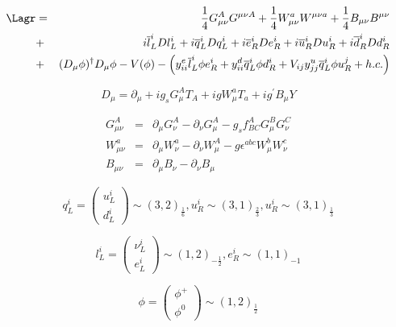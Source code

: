 \begin{eqnarray}
\Lagr & = & \frac{1}{4}G_{\mu\nu}^{A}G^{\mu\nu A} + \frac{1}{4}W_{\mu\nu}^{a}W^{\mu\nu a} + \frac{1}{4}B_{\mu\nu}B^{\mu\nu} \\
      & + & i\overline{l}_{L}^{i}Dl_{L}^{i} + i\overline{q}_{L}^{i}Dq_{L}^{i} + i\overline{e}_{R}^{i}De_{R}^{i} + i\overline{u}_{R}^{i}Du_{R}^{i}  + i\overline{d}_{R}^{i}Dd_{R}^{i} \\
      & + & (D_{\mu}\phi)^{\dagger}D_{\mu}\phi - V(\phi) - \left(y_{ii}^{e}\overline{l}_{L}^{i}\phi e_{R}^{i} + y_{ii}^{d}\overline{q}_{L}^{i}\phi d_{R}^{i} + V_{ij}y_{jj}^{u}\overline{q}_{L}^{i}\phi u_{R}^{j} + h.c.\right)
\end{eqnarray}

\begin{equation}
D_{\mu} = \partial_{\mu} + ig_{s}G_{\mu}^{A}T_{A} + igW_{\mu}^{a}T_{a} + ig^{\prime}B_{\mu}Y
\end{equation}

\begin{eqnarray}
G_{\mu\nu}^{A} & = & \partial_{\mu}G_{\nu}^{A} - \partial_{\nu}G_{\mu}^{A} - g_{s}f_{BC}^{A}G_{\mu}^{B}G_{\nu}^{C} \\
W_{\mu\nu}^{a} & = & \partial_{\mu}W_{\nu}^{a} - \partial_{\nu}W_{\mu}^{A} - g\epsilon^{abc}W_{\mu}^{b}W_{\nu}^{c} \\
B_{\mu\nu}     & = & \partial_{\mu}B_{\nu} - \partial_{\nu}B_{\mu}
\end{eqnarray}

\begin{equation}
q_{L}^{i} = \begin{pmatrix}u_{L}^{i} \\ d_{L}^{i}\end{pmatrix} \sim (3,2)_{\frac{1}{6}}, u_{R}^{i} \sim (3,1)_{\frac{2}{3}}, u_{R}^{i} \sim (3,1)_{\frac{1}{3}}
\end{equation}

\begin{equation}
l_{L}^{i} = \begin{pmatrix}\nu_{L}^{i} \\ e_{L}^{i}\end{pmatrix} \sim (1,2)_{-\frac{1}{2}}, e_{R}^{i} \sim (1,1)_{-1}
\end{equation}

\begin{equation}
\phi = \begin{pmatrix}\phi^{+} \\ \phi^{0}\end{pmatrix} \sim (1,2)_{\frac{1}{2}}
\end{equation}


